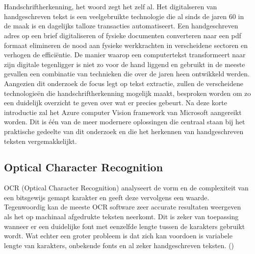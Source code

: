 \chapter{}
\label{ch:stand-van-zaken}



Handschriftherkenning, het woord zegt het zelf al. Het digitalseren van handgeschreven tekst is een veelgebruikte technologie die al sinds de jaren 60 in de maak is en dagelijks talloze transacties automatiseert. Een handgeschreven adres op een brief digitaliseren of fysieke documenten converteren naar een pdf formaat elimineren de nood aan fysieke werkkrachten in verscheidene sectoren en verhogen de efficiëntie. De manier waarop een computertekst transformeert naar zijn digitale tegenligger is niet zo voor de hand liggend en gebruikt in de meeste gevallen een combinatie van technieken die over de jaren heen ontwikkeld werden.
\newline
\newline
Aangezien dit onderzoek de focus legt op tekst extractie, zullen de verscheidene technologieën die handschriftherkenning mogelijk maakt, besproken worden om zo een duidelijk overzicht te geven over wat er precies gebeurt. 
Na deze korte introductie zal het Azure computer Vision framework van Microsoft aangereikt worden. Dit is één van de meer modernere oplossingen die centraal staan bij het praktische gedeelte van dit onderzoek en die het herkennen van handgeschreven teksten vergemakkelijkt.
\section{Optical Character Recognition}
 
OCR (Optical Character Recognition) analyseert de vorm en de complexiteit van een bitsgewijs gemapt karakter en geeft deze vervolgens een waarde. Tegenwoordig kan de meeste OCR software zeer accurate resultaten weergeven als het op machinaal afgedrukte teksten neerkomt. Dit is zeker van toepassing wanneer er een duidelijke font met eenzelfde lengte tussen de karakters gebruikt wordt. \newline \newline Wat echter een groter probleem is dat zich kan voordoen is variabele lengte van karakters, onbekende fonts en al zeker handgeschreven teksten. (\cite{Breithaupt2014}) 



